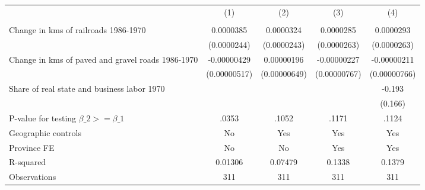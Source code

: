 {
\def\sym#1{\ifmmode^{#1}\else\(^{#1}\)\fi}
\begin{tabular}{l*{4}{c}}
\hline\hline
                &\multicolumn{1}{c}{(1)}&\multicolumn{1}{c}{(2)}&\multicolumn{1}{c}{(3)}&\multicolumn{1}{c}{(4)}\\
                &\multicolumn{1}{c}{}&\multicolumn{1}{c}{}&\multicolumn{1}{c}{}&\multicolumn{1}{c}{}\\
\hline
Change in kms of railroads 1986-1970&0.0000385         &0.0000324         &0.0000285         &0.0000293         \\
                &(0.0000244)         &(0.0000243)         &(0.0000263)         &(0.0000263)         \\
[1em]
Change in kms of paved and gravel roads 1986-1970&-0.00000429         &0.00000196         &-0.00000227         &-0.00000211         \\
                &(0.00000517)         &(0.00000649)         &(0.00000767)         &(0.00000766)         \\
[1em]
Share of real state and business labor 1970&                  &                  &                  &   -0.193         \\
                &                  &                  &                  &  (0.166)         \\
\hline
P-value for testing $\beta\_{2} >= \beta\_{1}$&    .0353         &    .1052         &    .1171         &    .1124         \\
Geographic controls&       No         &      Yes         &      Yes         &      Yes         \\
Province FE     &       No         &       No         &      Yes         &      Yes         \\
R-squared       &  0.01306         &  0.07479         &   0.1338         &   0.1379         \\
Observations    &      311         &      311         &      311         &      311         \\
\hline\hline
\end{tabular}
}
